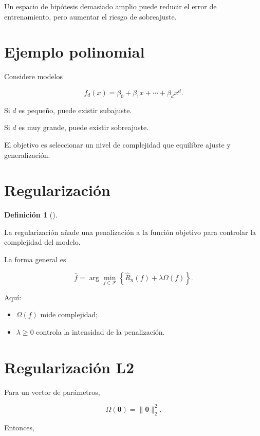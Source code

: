 \documentclass[
  spanish,
  11pt,
  letterpaper,
  DIV=11,
  numbers=noendperiod]{scrreprt}
\providecommand{\tightlist}{%
  \setlength{\itemsep}{0pt}\setlength{\parskip}{0pt}}
\theoremstyle{definition}
\newtheorem{definition}{Definición}[chapter]
\theoremstyle{plain}
\theoremstyle{definition}
\theoremstyle{remark}
\begin{document}
Un espacio de hipótesis demasiado amplio puede reducir el error de
entrenamiento, pero aumentar el riesgo de sobreajuste.

\section{Ejemplo polinomial}\label{ejemplo-polinomial}

Considere modelos

\[
f_d(x)
=
\beta_0+\beta_1x+\cdots+\beta_dx^d.
\]

Si \(d\) es pequeño, puede existir subajuste.

Si \(d\) es muy grande, puede existir sobreajuste.

El objetivo es seleccionar un nivel de complejidad que equilibre ajuste
y generalización.

\section{Regularización}\label{regularizaciuxf3n-1}

\begin{definition}[]\protect\hypertarget{def-regularizacion}{}\label{def-regularizacion}

La regularización añade una penalización a la función objetivo para
controlar la complejidad del modelo.

\end{definition}

La forma general es

\[
\widehat{f}
=
\arg\min_{f\in\mathcal{F}}
\left\{
\widehat{R}_n(f)
+
\lambda\Omega(f)
\right\}.
\]

Aquí:

\begin{itemize}
\tightlist
\item
  \(\Omega(f)\) mide complejidad;
\item
  \(\lambda\geq 0\) controla la intensidad de la penalización.
\end{itemize}

\section{Regularización L2}\label{regularizaciuxf3n-l2}

Para un vector de parámetros,

\[
\Omega(\boldsymbol{\theta})
=
\|\boldsymbol{\theta}\|_2^2.
\]

Entonces,
\end{document}
